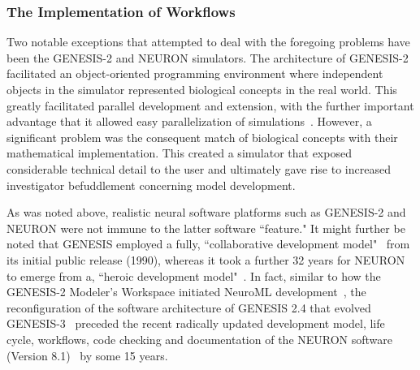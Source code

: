 \documentclass[10pt,letterpaper]{article}
\begin{document}
\subsubsection*{The Implementation of Workflows}

Two notable exceptions that attempted to deal with the foregoing problems have been the GENESIS-2 and NEURON simulators.  The architecture of GENESIS-2 facilitated an object-oriented programming environment where independent objects in the simulator represented biological concepts in the real world. This greatly facilitated parallel development and extension, with the further important advantage that it allowed easy parallelization of simulations~\cite{goddard97:_paral_genes}. However, a significant problem was the consequent match of biological concepts with their mathematical implementation. This created a simulator that exposed considerable technical detail to the user and ultimately gave rise to increased investigator befuddlement concerning model development.

As was noted above, realistic neural software platforms such as GENESIS-2 and NEURON were not immune to the latter software ``feature." It might further be noted that GENESIS employed a fully, ``collaborative development model"~\cite{gewaltig14} from its initial public release (1990), whereas it took a further 32 years for NEURON to emerge from a, ``heroic development model"~\cite{gewaltig14}. In fact,
similar to how the GENESIS-2 Modeler's Workspace initiated NeuroML development~\cite{nigel01:_towar_neurom},
the reconfiguration of the software architecture of GENESIS 2.4 that evolved GENESIS-3~\cite{cornelis08:_cbi_archit_comput_simul_realis,cornelis08:_model_neuros_genes} preceded the recent radically updated development model, life cycle, workflows, code checking and documentation of the NEURON software (Version 8.1)~\cite{awile22} by some 15 years.


\end{document}
